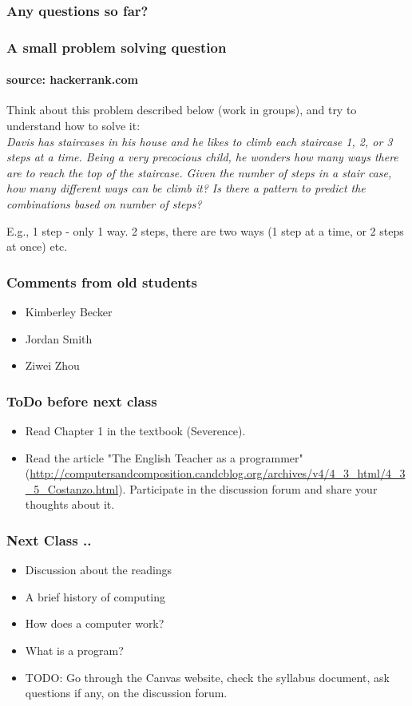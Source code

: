 \documentclass{beamer}
\begin{document}
\begin{frame}
\frametitle{Any questions so far?}
\end{frame}

\begin{frame}
\frametitle{A small problem solving question}
\framesubtitle{source: hackerrank.com}
Think about this problem described below (work in groups), and try to understand how to solve it: \\

\textit{Davis has staircases in his house and he likes to climb each staircase 1, 2, or 3 steps at a time. Being a very precocious child, he wonders how many ways there are to reach the top of the staircase. Given the number of steps in a stair case, how many different ways can be climb it? Is there a pattern to predict the combinations based on number of steps?}

E.g., 1 step - only 1 way. 2 steps, there are two ways (1 step at a time, or 2 steps at once) etc. 
\end{frame}

\begin{frame}
\frametitle{Comments from old students}
\begin{itemize}
\item Kimberley Becker
\item Jordan Smith
\item Ziwei Zhou
\end{itemize}
\end{frame}

\begin{frame}
\frametitle{ToDo before next class} 
\begin{itemize}
\item Read Chapter 1 in the textbook (Severence).
\item Read the article "The English Teacher as a programmer" (\url{http://computersandcomposition.candcblog.org/archives/v4/4_3_html/4_3_5_Costanzo.html}). Participate in the discussion forum and share your thoughts about it.
\end{itemize}
\end{frame}

\begin{frame}
\frametitle{Next Class ..} 
\begin{itemize}\itemsep2ex
\item Discussion about the readings
\item A brief history of computing
\item How does a computer work?
\item What is a program?
\item TODO: Go through the Canvas website, check the syllabus document, ask questions if any, on the discussion forum.
\end{itemize}
\end{frame}
\end{document}
